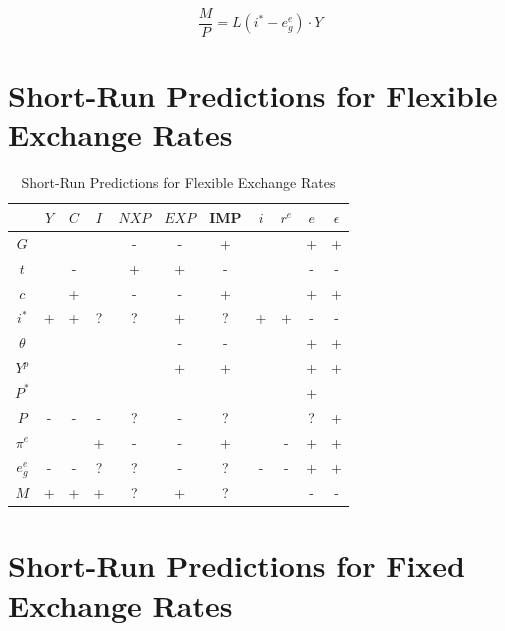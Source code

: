 \documentclass[
  letterpaper,
]{book}
\theoremstyle{plain}
\theoremstyle{remark}
\begin{document}
\[
\frac{M}{P}=L(i^*-e_g^e)\cdot Y
\]

\section{Short-Run Predictions for Flexible Exchange Rates}

\begin{table}
\begin{tabular}{*{11}{|c}|}
\hline
    &$Y$    &$C$    &$I$    &$NXP$ &$EXP$   &IMP    &$i$    &$r^e$  &$e$    &$\epsilon$  \\ \hline
$G$ &   &   &   &-  &-      &+  &   &   &+              &+\\ \hline
$t$ &   &-  &   &+  &+      &-  &   &   &-              &-\\ \hline
$c$ &   &+  &   &-  &-      &+  &   &   &+              &+\\ \hline
$i^*$   &+  &+  &?  &?  &+      &?  &+  &+  &-              &-\\ \hline
$\theta$ &  &   &   &   &-      &-  &   &   &+              &+\\ \hline
$Y^p$   &   &   &   &   &+      &+  &   &   &+              &+\\ \hline
$P^*$   &   &   &   &   &       &   &   &   &+              & \\ \hline
$P$ &-  &-  &-  &?  &-      &?  &   &   &?              &+\\ \hline
$\pi^e$ &   &   &+  &-  &-      &+  &   &-  &+              &+\\ \hline
$e^e_g$ &-  &-  &?  &?  &-      &?  &-  &-  &+              &+\\ \hline
$M$ &+  &+  &+  &?  &+      &?  &   &   &-              &- \\ \hline

\end{tabular}

\caption{Short-Run Predictions for Flexible Exchange Rates}

\end{table}

\section{Short-Run Predictions for Fixed Exchange Rates}
\end{document}
